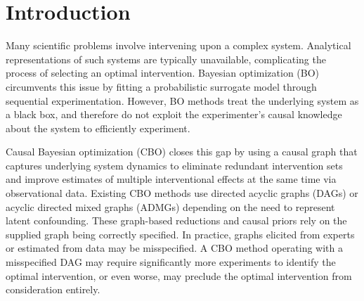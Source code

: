 \documentclass[twoside]{article}
\begin{document}


\begin{abstract}
Choosing effective interventions in complex systems often requires costly experiments. Causal Bayesian optimization guides these experiments using a causal graph, but errors in that graph can lead to poor predictions or exclude the best interventions. In practice, relationships between groups of variables may be more reliable than the detailed links between individual variables. Here we introduce causal Bayesian optimizers that use this coarse knowledge and intervene jointly on variables within selected groups. Their decisions are insensitive to graph errors that leave the relationships between groups unchanged. However, requiring joint interventions can also limit the outcomes they can achieve. We characterize this loss and identify conditions under which grouping variables preserves the best achievable outcome. Controlled experiments across three optimizer families examine these benefits and limitations, separating action restrictions from finite-budget differences due to modeling and optimization.
\end{abstract}

\section{Introduction}
\label{sec:intro}

Many scientific problems involve intervening upon a complex system. Analytical representations of such systems are typically unavailable, complicating the process of selecting an optimal intervention. Bayesian optimization (BO) circumvents this issue by fitting a probabilistic surrogate model through sequential experimentation. However, BO methods treat the underlying system as a black box, and therefore do not exploit the experimenter's causal knowledge about the system to efficiently experiment.

Causal Bayesian optimization (CBO) \citep{agliettiCausalBayesianOptimization2020b} closes this gap by using a causal graph that captures underlying system dynamics to eliminate redundant intervention sets and improve estimates of multiple interventional effects at the same time via observational data. Existing CBO methods use directed acyclic graphs (DAGs) or acyclic directed mixed graphs (ADMGs) depending on the need to represent latent confounding. These graph-based reductions and causal priors rely on the supplied graph being correctly specified. In practice, graphs elicited from experts or estimated from data may be misspecified. A CBO method operating with a misspecified DAG may require significantly more experiments to identify the optimal intervention, or even worse, may preclude the optimal intervention from consideration entirely.
\end{document}
